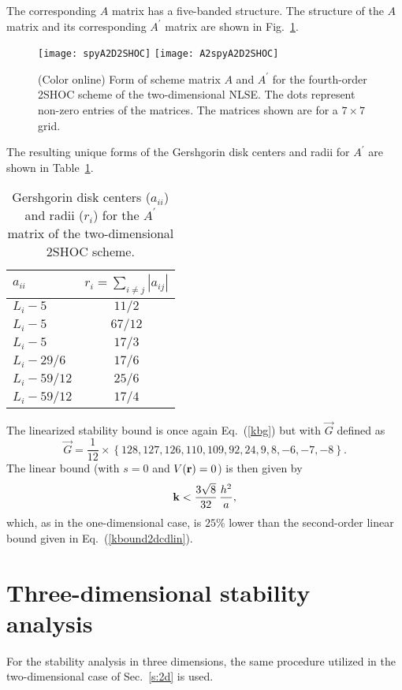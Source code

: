 \documentclass{article}
\begin{document}
The corresponding $A$ matrix has a five-banded structure.  The structure of the $A$ matrix and its corresponding $A^{\prime}$ matrix are shown in Fig.~\ref{f:A2D2SHOC}.
\begin{figure}[htbp]
\centering
\texttt{[image: spyA2D2SHOC]}
\texttt{[image: A2spyA2D2SHOC]}
\caption[Matrix structure for two-dimensional 2SHOC scheme.]{(Color online) Form of scheme matrix $A$ and $A^{\prime}$ for the fourth-order 2SHOC scheme of the two-dimensional NLSE.  The dots represent non-zero entries of the matrices.  The matrices shown are for a $7\times 7$ grid. \label{f:A2D2SHOC}}
\end{figure}

The resulting unique forms of the Gershgorin disk centers and radii for $A^{\prime}$ are shown in Table~\ref{t:2d2shocgd}. 
\begin{table}[htbp] 
\centering 
\caption{Gershgorin disk centers ($a_{ii}$) and radii ($r_i$) for the $A^{\prime}$ matrix of the two-dimensional 2SHOC scheme.}
\begin{tabular}{|l|c|} \hline
$a_{ii}$      & $r_i = \sum_{i\ne j} |a_{ij}|$ \\ \hline
$L_i - 5$     & $11/2$ \\
$L_i - 5$     & $67/12$\\
$L_i - 5$     & $17/3$ \\
$L_i - 29/6$  & $17/6$ \\
$L_i - 59/12$ & $25/6$ \\
$L_i - 59/12$ & $17/4$ \\
\hline
\end{tabular}
\label{t:2d2shocgd}
\end{table}
The linearized stability bound is once again Eq.~(\ref{kbg}) but with $\vec G$ defined as
\begin{equation}
\label{G2D2SHOC}
\vec G = \dfrac{1}{12} \times \left\{128,127,126,110,109,92,24,9,8,-6,-7,-8\right \}.
\end{equation}
The linear bound (with $s=0$ and $V({\bf r})=0$) is then given by
\begin{equation}
\label{kbound2d2shoclin}
{\bf k} < \frac{3\sqrt{8}}{32}\,\frac{h^2}{a},
\end{equation}
which, as in the one-dimensional case, is $25\%$ lower than the second-order linear bound given in Eq.~(\ref{kbound2dcdlin}).

\section{Three-dimensional stability analysis}
\label{s:3dstb}
For the stability analysis in three dimensions, the same procedure utilized in the two-dimensional case of Sec.~\ref{s:2d} is used.
\end{document}
